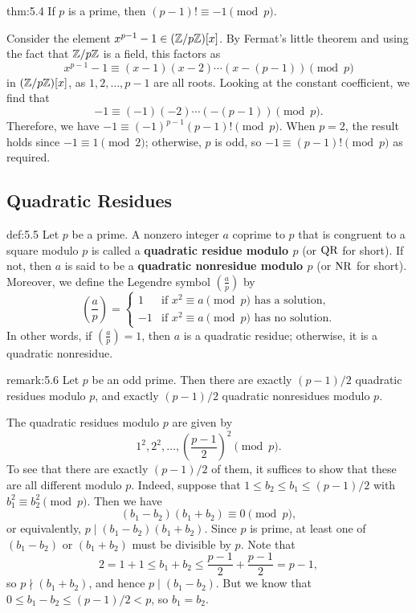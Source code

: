 \begin{theo}{thm:5.4}
    If $p$ is a prime, then $(p-1)! \equiv -1 \pmod p$. 
\end{theo}
\begin{pf}
    Consider the element $x^{p-1} - 1 \in (\mathbb{Z}/p\mathbb{Z})[x]$. By Fermat's little theorem 
    and using the fact that $\mathbb{Z}/p\mathbb{Z}$ is a field, this factors as 
    \[ x^{p-1} - 1 \equiv (x-1)(x-2) \cdots (x-(p-1)) \pmod p \] 
    in $(\mathbb{Z}/p\mathbb{Z})[x]$, as $1, 2, \dots, p-1$ are all roots. Looking at the constant 
    coefficient, we find that 
    \[ -1 \equiv (-1)(-2) \cdots (-(p-1)) \pmod p. \] 
    Therefore, we have $-1 \equiv (-1)^{p-1} (p-1)! \pmod p$. When $p = 2$, 
    the result holds since $-1 \equiv 1 \pmod 2$; otherwise, $p$ is odd, 
    so $-1 \equiv (p-1)! \pmod p$ as required. 
\end{pf}

\subsection{Quadratic Residues}\label{subsec:5.2}

\vspace{2ex}
\begin{defn}{def:5.5}
    Let $p$ be a prime. A nonzero integer $a$ coprime to $p$ that is congruent 
    to a square modulo $p$ is called a {\bf quadratic residue modulo $p$} 
    (or $\operatorname{QR}$ for short). If not, then $a$ is said to be a {\bf quadratic 
    nonresidue modulo $p$} (or $\operatorname{NR}$ for short). Moreover, we define the 
    Legendre symbol $(\frac ap)$ by 
    \[ \left( \frac ap \right) = \begin{cases} 1 & \text{if } 
        x^2 \equiv a \pmod p \text{ has a solution,} \\ 
        -1 & \text{if } x^2 \equiv a \pmod p \text{ has no solution.} \end{cases} \]
    In other words, if $(\frac ap) = 1$, then $a$ is a quadratic residue; otherwise, 
    it is a quadratic nonresidue. 
\end{defn}

\begin{remark}{remark:5.6}
    Let $p$ be an odd prime. Then there are exactly $(p-1)/2$ quadratic residues 
    modulo $p$, and exactly $(p-1)/2$ quadratic nonresidues modulo $p$.
\end{remark}
\begin{pf}
    The quadratic residues modulo $p$ are given by 
    \[ 1^2, 2^2, \dots, \left(\frac{p-1}2\right)^{\!2} \pmod p. \] 
    To see that there are exactly $(p-1)/2$ of them, it suffices to show that these 
    are all different modulo $p$. Indeed, suppose that $1 \leq b_2 \leq b_1 
    \leq (p-1)/2$ with $b_1^2 \equiv b_2^2 \pmod p$. Then we have 
    \[ (b_1 - b_2)(b_1 + b_2) \equiv 0 \pmod p, \] 
    or equivalently, $p \mid (b_1 - b_2)(b_1 + b_2)$. Since $p$ is prime, 
    at least one of $(b_1 - b_2)$ or $(b_1 + b_2)$ must be divisible by $p$. 
    Note that 
    \[ 2 = 1 + 1 \leq b_1 + b_2 \leq \frac{p-1}2 + \frac{p-1}2 = p-1, \] 
    so $p \nmid (b_1 + b_2)$, and hence $p \mid (b_1 - b_2)$. But 
    we know that $0 \leq b_1 - b_2 \leq (p-1)/2 < p$, so $b_1 = b_2$.
\end{pf}

